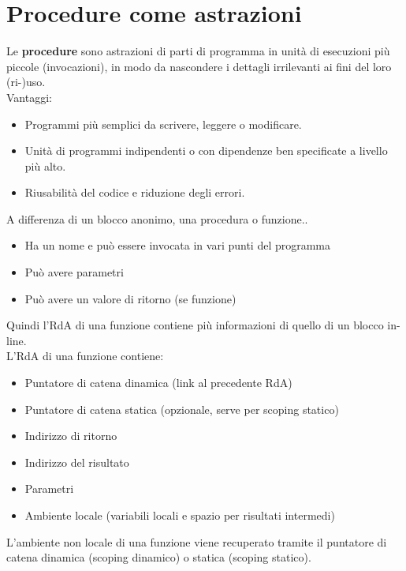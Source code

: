 \documentclass[10pt]{article}
\begin{document}
\section{Procedure come astrazioni}
Le \textbf{procedure} sono astrazioni di parti di programma in unità di esecuzioni più piccole (invocazioni), in modo da nascondere i dettagli irrilevanti ai fini del loro (ri-)uso.\\
Vantaggi:
\begin{itemize}
    \item
    Programmi più semplici da scrivere, leggere o modificare.
    \item 
    Unità di programmi indipendenti o con dipendenze ben specificate a livello più alto.
    \item 
    Riusabilità del codice e riduzione degli errori.
\end{itemize}
A differenza di un blocco anonimo, una procedura o funzione..
\begin{itemize}
    \item Ha un nome e può essere invocata in vari punti del programma
    \item Può avere parametri
    \item Può avere un valore di ritorno (se funzione)
\end{itemize}
Quindi l'RdA di una funzione contiene più informazioni di quello di un blocco in-line.\\
L'RdA di una funzione contiene:
\begin{itemize}
    \item Puntatore di catena dinamica (link al precedente RdA)
    \item Puntatore di catena statica (opzionale, serve per scoping statico)
    \item Indirizzo di ritorno
    \item Indirizzo del risultato
    \item Parametri
    \item Ambiente locale (variabili locali e spazio per risultati intermedi)
\end{itemize}
L'ambiente non locale di una funzione viene recuperato tramite il puntatore di catena dinamica (scoping dinamico) o statica (scoping statico).
\end{document}
